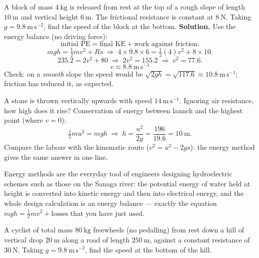 \documentclass[11pt]{article}
\begin{document}
\begin{exoresolu}
A block of mass $4\ \mathrm{kg}$ is released from rest at the top of a rough slope of length $10\ \mathrm{m}$ and vertical height $6\ \mathrm{m}$. The frictional resistance is constant at $8\ \mathrm{N}$. Taking $g = 9.8\ \mathrm{m\,s^{-2}}$, find the speed of the block at the bottom.
\tcblower
\textbf{Solution.} Use the energy balance (no driving force):
\[
\text{initial PE} = \text{final KE} + \text{work against friction}.
\]
\[
mgh = \tfrac12 mv^2 + Rs
\;\Longrightarrow\;
4 \times 9.8 \times 6 = \tfrac12 (4) v^2 + 8 \times 10.
\]
\[
235.2 = 2v^2 + 80 \;\Longrightarrow\; 2v^2 = 155.2 \;\Longrightarrow\; v^2 = 77.6.
\]
\[
\boxed{v \approx 8.8\ \mathrm{m\,s^{-1}}}
\]
Check: on a \emph{smooth} slope the speed would be $\sqrt{2gh} = \sqrt{117.6} \approx 10.8\ \mathrm{m\,s^{-1}}$; friction has reduced it, as expected.
\end{exoresolu}

\begin{exemplebox}
A stone is thrown vertically upwards with speed $14\ \mathrm{m\,s^{-1}}$. Ignoring air resistance, how high does it rise? Conservation of energy between launch and the highest point (where $v=0$):
\[
\tfrac12 mu^2 = mgh \;\Longrightarrow\; h = \frac{u^2}{2g} = \frac{196}{19.6} = 10\ \mathrm{m}.
\]
Compare the labour with the kinematic route ($v^2=u^2-2gs$): the energy method gives the same answer in one line.
\end{exemplebox}

\begin{savaistu}
Energy methods are the everyday tool of engineers designing hydroelectric schemes such as those on the Sanaga river: the potential energy of water held at height is converted into kinetic energy and then into electrical energy, and the whole design calculation is an energy balance --- exactly the equation $mgh = \tfrac12 mv^2 + \text{losses}$ that you have just used.
\end{savaistu}

\begin{exercice}[]
A cyclist of total mass $80\ \mathrm{kg}$ freewheels (no pedalling) from rest down a hill of vertical drop $20\ \mathrm{m}$ along a road of length $250\ \mathrm{m}$, against a constant resistance of $30\ \mathrm{N}$. Taking $g = 9.8\ \mathrm{m\,s^{-2}}$, find the speed at the bottom of the hill.
\end{exercice}
\end{document}
